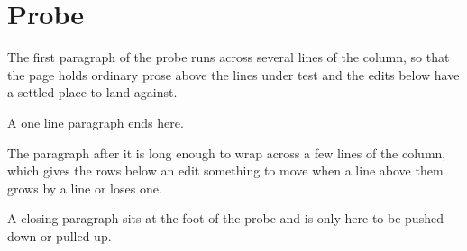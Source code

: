 \documentclass[11pt]{article}
\begin{document}
\section{Probe}
The first paragraph of the probe runs across several lines of the column, so that the page holds ordinary prose above the lines under test and the edits below have a settled place to land against.

A one line paragraph ends here.

The paragraph after it is long enough to wrap across a few lines of the column, which gives the rows below an edit something to move when a line above them grows by a line or loses one.

A closing paragraph sits at the foot of the probe and is only here to be pushed down or pulled up.
\end{document}
